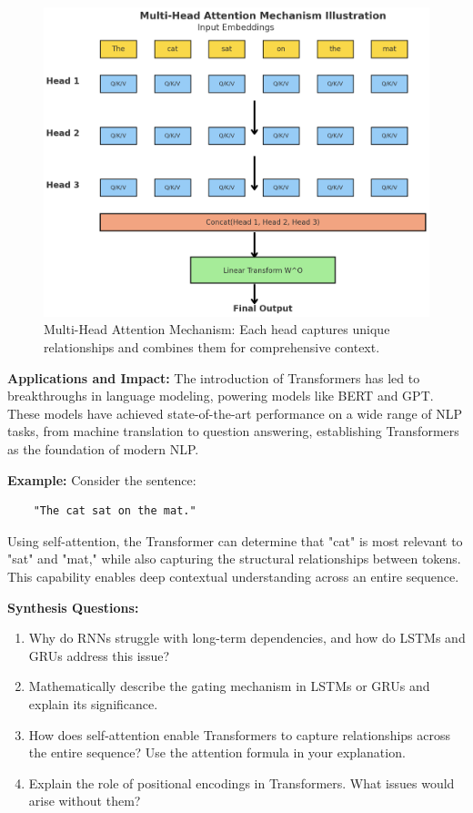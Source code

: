     \begin{figure}[H]
        \centering
        \includegraphics[width=\linewidth]{lm/multi_head_attention_example.png}
        \caption{Multi-Head Attention Mechanism: Each head captures unique relationships and combines them for comprehensive context.}
        \label{fig:multi_head_attention_example}
    \end{figure}

    \textbf{Applications and Impact:} The introduction of Transformers has led to breakthroughs in language modeling, powering models like BERT and GPT. These models have achieved state-of-the-art performance on a wide range of NLP tasks, from machine translation to question answering, establishing Transformers as the foundation of modern NLP. 

    \textbf{Example:}
    Consider the sentence:
    \begin{verbatim}
    "The cat sat on the mat."
    \end{verbatim}
    Using self-attention, the Transformer can determine that "cat" is most relevant to "sat" and "mat," while also capturing the structural relationships between tokens. This capability enables deep contextual understanding across an entire sequence.


\begin{questionbox}
\textbf{Synthesis Questions:}

\begin{enumerate}
    \item Why do RNNs struggle with long-term dependencies, and how do LSTMs and GRUs address this issue?
    \item Mathematically describe the gating mechanism in LSTMs or GRUs and explain its significance.
    \item How does self-attention enable Transformers to capture relationships across the entire sequence? Use the attention formula in your explanation.
    \item Explain the role of positional encodings in Transformers. What issues would arise without them?
\end{enumerate}

\end{questionbox}


